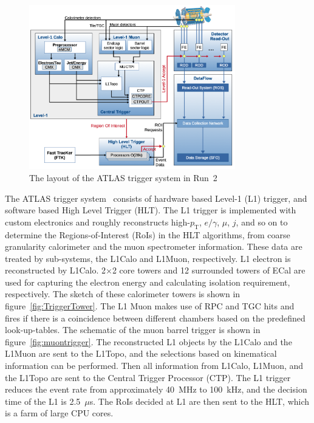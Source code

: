 \begin{figure}[tbp]
\begin{center}
 \includegraphics[width=0.8\textwidth,keepaspectratio]{figures/detector/Trigger}
\caption{
The layout of the ATLAS trigger system in Run~2
}
\label{fig:Trigger}
\end{center}
\end{figure}
The ATLAS trigger system~\cite{TRIG-2019-04} consists of hardware based Level-1 (L1) trigger, and software based High Level Trigger (HLT). 
The L1 trigger is implemented with custom electronics and roughly reconstructs high-$p_\mathrm{T}$, $e/\gamma$, $\mu$, $j$, and so on to determine the Regions-of-Interest (RoIs) in the HLT algorithms, from coarse granularity calorimeter and the muon spectrometer information. 
These data are treated by sub-systems, the L1Calo and L1Muon, respectively. 
L1 electron is reconstructed by L1Calo. 2$\times$2 core towers and 12 surrounded towers of ECal are used for capturing the electron energy and calculating isolation requirement, respectively. The sketch of these calorimeter towers is shown in figure~\ref{fig:TriggerTower}.
The L1 Muon makes use of RPC and TGC hits and fires if there is a coincidence between different chambers based on the predefined look-up-tables.
The schematic of the muon barrel trigger is shown in figure~\ref{fig:muontrigger}.
The reconstructed L1 objects by the L1Calo and the L1Muon are sent to the L1Topo, and the selections based on kinematical information can be performed. 
Then all information from L1Calo, L1Muon, and the L1Topo are sent to the Central Trigger Processor (CTP). 
The L1 trigger reduces the event rate from approximately 40~MHz to 100~kHz, and the decision time of the L1 is 2.5~$\mu$s.
The RoIs decided at L1 are then sent to the HLT, which is a farm of large CPU cores.
